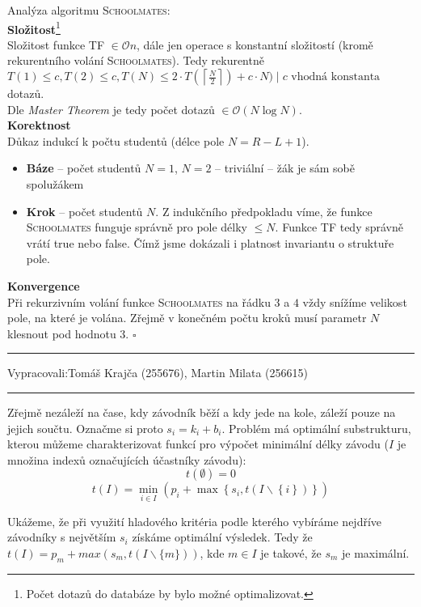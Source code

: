 \documentclass[12pt]{article}
\newcommand{\ceil}[2]{\left\lceil\frac{#1}{#2}\right\rceil}
\newcommand{\zadani}[2]{
{\large
\noindent {\bf IB108 \hfill{} Sada #1, Příklad #2 \\[-4mm]}
\noindent\hrule
\vspace{2mm}
\noindent Vypracovali:\hfill{}Tomáš Krajča (255676), Martin Milata (256615)
\vspace{3mm}
\hrule
\bigskip\bigskip}
}
\begin{document}
\bigskip
\noindent
Analýza algoritmu \textsc{Schoolmates}:\\
\textbf{Složitost}\footnote{Počet dotazů do databáze by bylo možné
optimalizovat.}\\
Složitost funkce \textsc{TF} $\in \mathcal{O}{n}$, dále jen operace s konstantní
složitostí (kromě rekurentního volání \textsc{Schoolmates}).
Tedy rekurentně $T(1) \leq c, T(2) \leq c, T(N) \leq 2\cdot T(\ceil{N}{2}) +
c\cdot N) \mid c \text{ vhodná konstanta}$ dotazů.\\
Dle \textit{Master Theorem} je tedy počet dotazů $\in \mathcal{O}(N\log N)$.\\
\textbf{Korektnost}\\
Důkaz indukcí k počtu studentů (délce pole $N = R - L + 1$).
\renewcommand{\labelenumi}{\textbf{\alph{enumi})}}
\begin{itemize}
\item \textbf{Báze} -- počet studentů $N=1$, $N=2$ -- triviální -- žák je sám sobě spolužákem
\item \textbf{Krok} -- počet studentů $N$. Z indukčního předpokladu víme, že funkce
\textsc{Schoolmates} funguje správně pro pole délky $\leq N$. 
Funkce \textsc{TF} tedy správně vrátí true nebo
false. Čímž jsme dokázali i platnost invariantu o struktuře pole.
\end{itemize}
\textbf{Konvergence}\\ 
Při rekurzivním volání funkce \textsc{Schoolmates} na
řádku $3$ a $4$ vždy
snížíme velikost pole, na které je volána. Zřejmě v konečném počtu kroků musí
parametr $N$ klesnout pod hodnotu $3$. 
\hfill$\square$



\clearpage
\zadani{2}{2}


\noindent
Zřejmě nezáleží na čase, kdy závodník běží a kdy jede na kole, záleží pouze na jejich součtu.
Označme si proto $s_i = k_i + b_i$.  Problém má optimální substrukturu, kterou můžeme
charakterizovat funkcí pro výpočet minimální délky závodu ($I$ je množina indexů označujících
účastníky závodu):
$$t(\emptyset) = 0$$
$$t(I) = 
\min_{i \in I} \left(
		p_i + \max \left\{
				s_i, t(I\smallsetminus\left\{i\right\})
		\right\}
\right)$$

Ukážeme, že při využití hladového kritéria podle kterého vybíráme nejdříve závodníky s největším
$s_i$ získáme optimální výsledek. Tedy že $t(I) = p_m + max(s_m, t(I \smallsetminus \{m\}))$, kde $m
\in I$ je takové, že $s_m$ je maximální.
\end{document}
